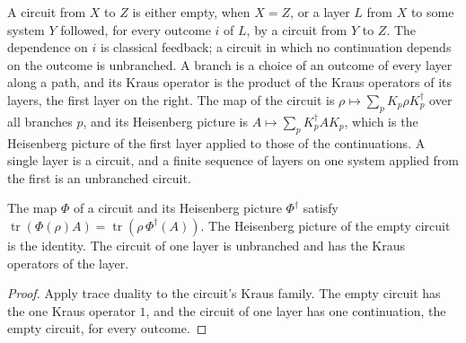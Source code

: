 \begin{definition}[Circuit]
    \label{def:circuits_circuit}
    \leanok
    A circuit from $X$ to $Z$ is either empty, when $X=Z$, or a layer $L$ from $X$
    to some system $Y$ followed, for every outcome $i$ of $L$, by a circuit from $Y$
    to $Z$. The dependence on $i$ is classical feedback; a circuit in which no
    continuation depends on the outcome is unbranched. A branch is a choice of an
    outcome of every layer along a path, and its Kraus operator is the product of
    the Kraus operators of its layers, the first layer on the right. The map of the
    circuit is $\rho\mapsto\sum_pK_p\rho K_p^\dagger$ over all branches $p$, and its
    Heisenberg picture is $A\mapsto\sum_pK_p^\dagger AK_p$, which is the Heisenberg
    picture of the first layer applied to those of the continuations. A single layer is
    a circuit, and a finite sequence of layers on one system applied from the first is an
    unbranched circuit.
\end{definition}

\begin{lemma}
    \label{lem:circuits_duality}
    \leanok
    The map $\Phi$ of a circuit and its Heisenberg picture $\Phi^\dagger$ satisfy
    $\operatorname{tr}(\Phi(\rho)A)=\operatorname{tr}(\rho\,\Phi^\dagger(A))$. The
    Heisenberg picture of the empty circuit is the identity. The circuit of one layer is
    unbranched and has the Kraus operators of the layer.
\end{lemma}
\begin{proof}\leanok
    Apply trace duality to the circuit's Kraus family. The empty circuit has the one Kraus operator $1$, and the
    circuit of one layer has one continuation, the empty circuit, for every outcome.
\end{proof}

